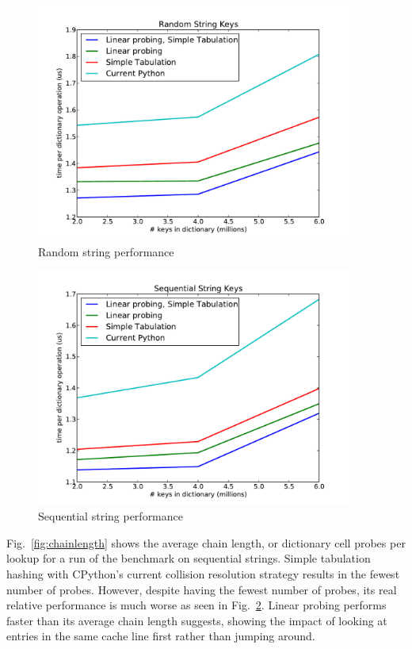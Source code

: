 \documentclass[runningheads,a4paper]{llncs}
\begin{document}
\begin{figure}[H]
  \centering
  \includegraphics[width=4.1in]{randstring.pdf}
  \caption{Random string performance}
  \label{fig:randstring}
\end{figure}
\begin{figure}[H]
  \centering
  \includegraphics[width=4.1in]{seqstring.pdf}
  \caption{Sequential string performance}
  \label{fig:seqstring}
\end{figure}

Fig.~\ref{fig:chainlength} shows the average chain length, or dictionary
cell probes per lookup for a run of the benchmark on sequential strings.
Simple tabulation hashing with CPython's current collision resolution strategy
results in the fewest number of probes.  However, despite having the fewest
number of probes, its real relative performance is much worse as seen in Fig.~\ref{fig:seqstring}.  Linear probing performs faster than its average
chain length suggests, showing the impact of looking at entries in the same
cache line first rather than jumping around.
\end{document}
